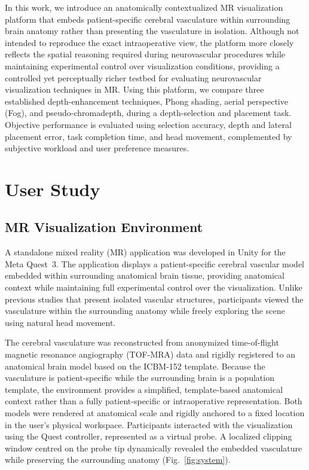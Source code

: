 \documentclass[runningheads]{llncs}
\begin{document}
In this work, we introduce an anatomically contextualized MR visualization platform that embeds patient-specific cerebral vasculature within surrounding brain anatomy rather than presenting the vasculature in isolation. Although not intended to reproduce the exact intraoperative view, the platform more closely reflects the spatial reasoning required during neurovascular procedures while maintaining experimental control over visualization conditions, providing a controlled yet perceptually richer testbed for evaluating neurovascular visualization techniques in MR. Using this platform, we compare three established depth-enhancement techniques, Phong shading, aerial perspective (Fog), and pseudo-chromadepth, during a depth-selection and placement task. Objective performance is evaluated using selection accuracy, depth and lateral placement error, task completion time, and head movement, complemented by subjective workload and user preference measures. 

\section{User Study}\label{sec:userstudy}

\subsection{MR Visualization Environment}
A standalone mixed reality (MR) application was developed in Unity for the Meta Quest~3. The application displays a patient-specific cerebral vascular model embedded within surrounding anatomical brain tissue, providing anatomical context while maintaining full experimental control over the visualization. Unlike previous studies that present isolated vascular structures, participants viewed the vasculature within the surrounding anatomy while freely exploring the scene using natural head movement.

The cerebral vasculature was reconstructed from anonymized time-of-flight magnetic resonance angiography (TOF-MRA) data and rigidly registered to an anatomical brain model based on the ICBM-152 template. Because the vasculature is patient-specific while the surrounding brain is a population template, the environment provides a simplified, template-based anatomical context rather than a fully patient-specific or intraoperative representation. Both models were rendered at anatomical scale and rigidly anchored to a fixed location in the user's physical workspace. Participants interacted with the visualization using the Quest controller, represented as a virtual probe. A localized clipping window centred on the probe tip dynamically revealed the embedded vasculature while preserving the surrounding anatomy (Fig.~\ref{fig:system}).
\end{document}
